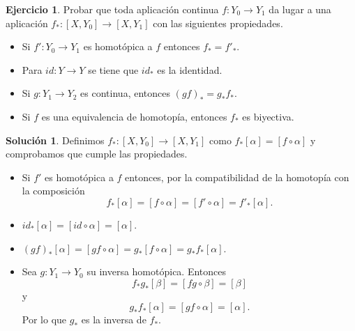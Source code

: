 \documentclass{article}
\theoremstyle{plain}
\theoremstyle{definition}
\newtheorem{exercise}{Ejercicio}
\newtheorem*{sol*}{Solución}
\begin{document}
\newpage
\begin{exercise}
Probar que toda aplicación continua $f:Y_0\to Y_1$ da lugar a una aplicación $f_*:[X,Y_0]\to[X,Y_1]$ con las siguientes propiedades.
\begin{itemize}
\item Si $f':Y_0\to Y_1$ es homotópica a $f$ entonces $f_* =f'_*$.
\item Para $id:Y\to Y$ se tiene que $id_*$ es la identidad.
\item Si $g:Y_1\to Y_2$ es continua, entonces $(gf)_* = g_*f_*$.
\item Si $f$ es una equivalencia de homotopía, entonces $f_*$ es biyectiva.
\end{itemize}
\end{exercise}
\begin{sol*}
Definimos $f_*:[X,Y_0]\to[X,Y_1]$ como $f_*[\alpha]=[f\circ\alpha]$ y comprobamos que cumple las propiedades. 
\begin{itemize}
\item Si $f'$ es homotópica a $f$ entonces, por la compatibilidad de la homotopía con la composición 
$$f_*[\alpha]=[f\circ\alpha]=[f'\circ\alpha]=f'_*[\alpha].$$
\item $id_*[\alpha]=[id\circ\alpha]=[\alpha]$.
\item $(gf)_*[\alpha]=[gf\circ\alpha]=g_*[f\circ\alpha]=g_*f_*[\alpha]$.
\item Sea $g:Y_1\to Y_0$ su inversa homotópica. Entonces
$$f_*g_*[\beta]=[fg\circ\beta]=[\beta]$$
y 
$$g_*f_*[\alpha]=[gf\circ\alpha]=[\alpha].$$
Por lo que $g_*$ es la inversa de $f_*$. 
\end{itemize}
\end{sol*}
\end{document}
